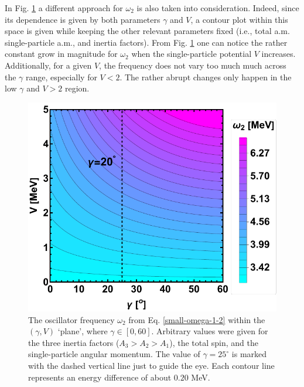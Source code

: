 In Fig. \ref{fig-omega2-V-Gamma} a different approach for $\omega_2$ is also taken into consideration. Indeed, since its dependence is given by both parameters $\gamma$ and $V$, a contour plot within this space is given while keeping the other relevant parameters fixed (i.e., total a.m. single-particle a.m., and inertia factors). From Fig. \ref{fig-omega2-V-Gamma} one can notice the rather constant grow in magnitude for $\omega_2$ when the single-particle potential $V$ increases. Additionally, for a given $V$, the frequency does not vary too much much across the $\gamma$ range, especially for $V<2$. The rather abrupt changes only happen in the low $\gamma$ and $V>2$ region.
\begin{figure}
    \centering
    \includegraphics[scale=0.8]{Chapters/Figures/omega-2-gamma-V.pdf}
    \caption{The oscillator frequency $\omega_2$ from Eq. \ref{small-omega-1-2} within the $(\gamma,V)$ `plane', where $\gamma\in[0,60]$. Arbitrary values were given for the three inertia factors ($A_3>A_2>A_1$), the total spin, and the single-particle angular momentum. The value of $\gamma=25^\circ$ is marked with the dashed vertical line just to guide the eye. Each contour line represents an energy difference of about $0.20$ MeV.}
    \label{fig-omega2-V-Gamma}
\end{figure}

